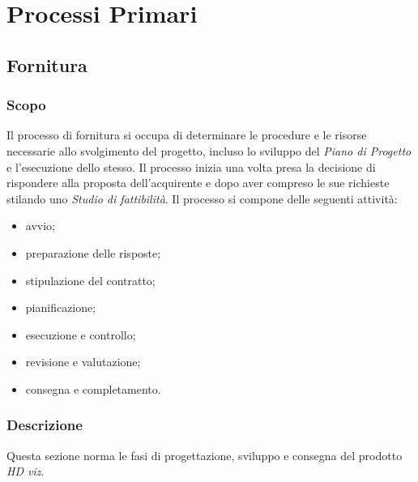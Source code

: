 \section{Processi Primari}
	\subsection{Fornitura}
		\subsubsection{Scopo}
		Il processo di fornitura si occupa di determinare le procedure e le risorse necessarie allo svolgimento del progetto, incluso lo sviluppo del \textit{Piano di Progetto} e l'esecuzione dello stesso. Il processo inizia una volta presa la decisione di rispondere alla proposta dell'acquirente e dopo aver compreso le sue richieste stilando uno \textit{Studio di fattibilità}. Il processo si compone delle seguenti attività:
		\begin{itemize}
		    \item avvio;
		    \item preparazione delle risposte;
		    \item stipulazione del contratto;
		    \item pianificazione;
		    \item esecuzione e controllo;
		    \item revisione e valutazione;
		    \item consegna e completamento.
		\end{itemize}
		\subsubsection{Descrizione}
		Questa sezione norma le fasi di progettazione, sviluppo e consegna del prodotto \textit{HD viz}. 
